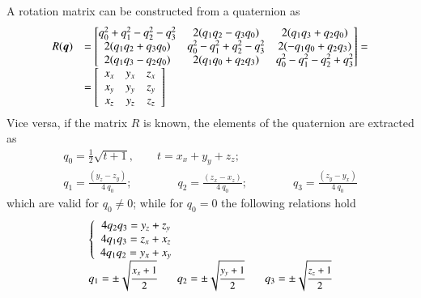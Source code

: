A rotation matrix can be constructed from a quaternion as
\begin{equation}
\begin{array}{rl}
R({\boldsymbol{q}})& =\left[
	\begin{matrix}
	 q_0^2 + q_1^2 - q_2^2 - q_3^2  &  2(q_1 q_2 - q_3 q_0)   &  2(q_1 q_3 + q_2 q_0)  \cr
	 2(q_1 q_2 + q_3 q_0)  &  q_0^2 - q_1^2 + q_2^2 - q_3^2  &   2(-q_1 q_0 + q_2 q_3) \cr
     2(q_1 q_3 - q_2 q_0)  &  2(q_1 q_0 + q_2 q_3)  & q_0 ^2 -q_1^2 -q_2^2 + q_3^2   
	\end{matrix}
	\right] =\\
&=\left[
\begin{array}{ccc}
        x_{x}            &       y_{x}           &       z_{x}  \\
        x_{y}            &       y_{y}           &       z_{y}  \\
        x_{z}            &       y_{z}           &       z_{z}
\end{array}\right]
\end{array}
\label{new_eq:fromQtoR}
\end{equation}
Vice versa, if the matrix $R$ is known, the elements of the quaternion are extracted as
\begin{equation}
\begin{array}{l}
q_0=\frac{1}{2} \sqrt{t+1},\qquad t=x_{x}+y_{y}+z_{z};\\[2ex]
  q_1=\frac{(y_{z}-z_{y})}{4\: q_0};\qquad \qquad
  q_2=\frac{(z_{x}-x_{z})}{4\: q_0};\qquad \qquad
  q_3=\frac{(z_{y}-y_{x})}{4\: q_0}
\label{eq:fromRtoQ}
\end{array}
\end{equation}
which are valid for $q_0 \neq 0$; while for $q_0=0$ the following relations hold
\begin{equation}
\begin{array}{l}
        \left\{
        \begin{array}{c}
                4 q_2 q_3 =y_{z}+z_{y} \\
                4 q_1 q_3 =z_{x}+x_{z} \\
                4 q_1 q_2 =y_{x}+x_{y}
        \end{array}
        \right.
\ \\
{\small
                q_1=\pm \sqrt{\cfrac{x_{x}+1}{2}} \qquad
                q_2=\pm \sqrt{\cfrac{y_{y}+1}{2}} \qquad
                q_3=\pm \sqrt{\cfrac{z_{z}+1}{2}}
}
\end{array}
\label{eq:fromRtoQ2}
\end{equation}

